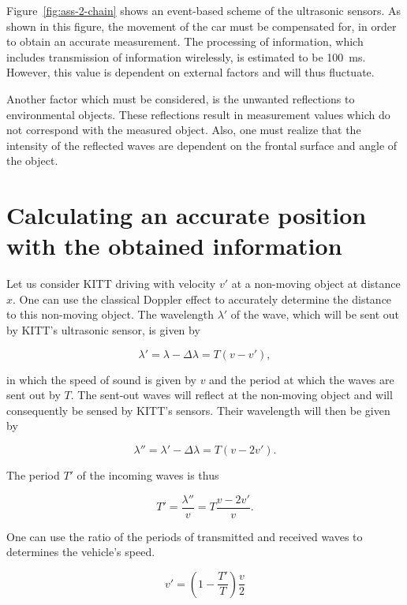 \documentclass[11pt,titlepage]{report}
\begin{document}
Figure~\ref{fig:ass-2-chain} shows an event-based scheme of the ultrasonic sensors. As shown in this figure, the movement of the car must be compensated for, in order to obtain an accurate measurement. The processing of information, which includes transmission of information wirelessly, is estimated to be \SI{100}{ms}. However, this value is dependent on external factors and will thus fluctuate.

Another factor which must be considered, is the unwanted reflections to environmental objects. These reflections result in measurement values which do not correspond with the measured object. Also, one must realize that the intensity of the reflected waves are dependent on the frontal surface and angle of the object. 

\section{Calculating an accurate position with the obtained information}
Let us consider KITT driving with velocity $v'$ at a non-moving object at distance $x$. One can use the classical Doppler effect to accurately determine the distance to this non-moving object. The wavelength $\lambda'$ of the wave, which will be sent out by KITT's ultrasonic sensor, is given by

\begin{equation}
	\lambda' = \lambda - \Delta \lambda = T (v - v'),
\end{equation}

in which the speed of sound is given by $v$ and the period at which the waves are sent out by $T$. The sent-out waves will reflect at the non-moving object and will consequently be sensed by KITT's sensors. Their wavelength will then be given by

\begin{equation}
	\lambda'' = \lambda' - \Delta \lambda = T (v - 2 v').
\end{equation}

The period $T'$ of the incoming waves is thus

\begin{equation}
	T' = \frac{\lambda''}{v} = T \frac{v - 2 v'}{v}.
\end{equation}

One can use the ratio of the periods of transmitted and received waves to determines the vehicle's speed.

\begin{equation} \label{eq:ass-2-vel-car}
 	v' = \left(1-\frac{T'}{T} \right) \frac{v}{2}
 \end{equation}
\end{document}
